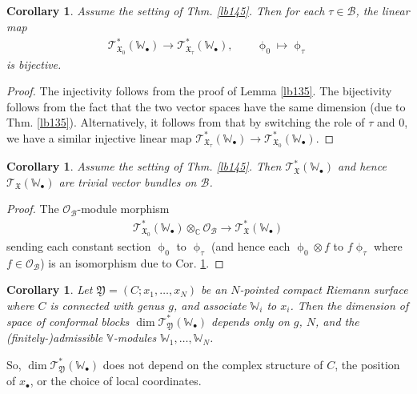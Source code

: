 \documentclass[12pt,a4paper,notitlepage]{article}
\theoremstyle{definition}
\theoremstyle{plain}
\newtheorem{co}[df]{Corollary}
\newcommand{\fk}{\mathfrak}
\newcommand{\mc}{\mathcal}
\newcommand{\scr}{\mathscr}
\newcommand{\blt}{\bullet}
\newcommand{\Vbb}{\mathbb V}
\newcommand{\Wbb}{\mathbb W}
\newcommand{\Cbb}{\mathbb C}
\numberwithin{equation}{section}
\begin{document}
\subsection{}

\begin{co}\label{lb146}
Assume the setting of Thm. \ref{lb145}. Then for each $\tau\in\mc B$, the linear map
\begin{align*}
\scr T_{\fk X_0}^*(\Wbb_\blt)\rightarrow\scr T_{\fk X_\tau}^*(\Wbb_\blt),\qquad \upphi_0\mapsto\upphi_\tau
\end{align*}
is bijective.
\end{co}


\begin{proof}
The injectivity follows from the proof of Lemma \ref{lb135}. The bijectivity follows from the fact that the two vector spaces have the same dimension (due to Thm. \ref{lb135}). Alternatively, it follows from that by switching the role of $\tau$ and $0$, we have a similar injective linear map $\scr T^*_{\fk X_\tau}(\Wbb_\blt)\rightarrow\scr T^*_{\fk X_0}(\Wbb_\blt)$.
\end{proof}


\begin{co}
Assume the setting of Thm. \ref{lb145}. Then $\scr T_{\fk X}^*(\Wbb_\blt)$ and hence $\scr T_{\fk X}(\Wbb_\blt)$ are  trivial vector bundles on $\mc B$.
\end{co}

\begin{proof}
The $\scr O_{\mc B}$-module morphism
\begin{align*}
\scr T_{\fk X_0}^*(\Wbb_\blt)\otimes_\Cbb\scr O_{\mc B}\rightarrow\scr T_{\fk X}^*(\Wbb_\blt)
\end{align*}
sending each constant section $\upphi_0$ to $\upphi_\tau$ (and hence each $\upphi_0\otimes f$ to $f\upphi_\tau$ where $f\in\scr O_{\mc B}$) is an isomorphism due to Cor. \ref{lb146}.
\end{proof}



\begin{co}
Let $\fk Y=(C;x_1,\dots,x_N)$ be an $N$-pointed compact Riemann surface where $C$ is connected with genus $g$, and associate $\Wbb_i$ to $x_i$. Then the dimension of space of conformal blocks $\dim\scr T_{\fk Y}^*(\Wbb_\blt)$ depends only on $g$, $N$, and the (finitely-)admissible $\Vbb$-modules $\Wbb_1,\dots,\Wbb_N$.
\end{co}

So, $\dim\scr T_{\fk Y}^*(\Wbb_\blt)$ does not depend on the complex structure of $C$, the position of $x_\blt$, or the choice of local coordinates. 
\end{document}
